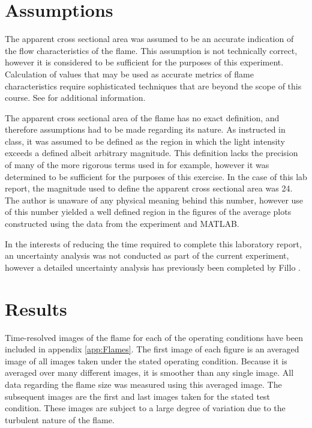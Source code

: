 \documentclass[12pt]{ussci} %
\begin{document}
\section{Assumptions}
The apparent cross sectional area was assumed to be an accurate indication of the flow characteristics of the flame.  This assumption is not technically correct, however it is considered to be sufficient for the purposes of this experiment.  Calculation of values that may be used as accurate metrics of flame characteristics require sophisticated techniques that are beyond the scope of this course.  See \cite{Fillo2017} for additional information.


The apparent cross sectional area of the flame has no exact definition, and therefore assumptions had to be made regarding its nature.  As instructed in class, it was assumed to be defined as the region in which the light intensity exceeds a defined albeit arbitrary magnitude.  This definition lacks the precision of many of the more rigorous terms used in \cite{Fillo2015} for example, however it was determined to be sufficient for the purposes of this exercise.  In the case of this lab report, the magnitude used to define the apparent cross sectional area was 24.  The author is unaware of any physical meaning behind this number, however use of this number yielded a well defined region in the figures of the average plots constructed using the data from the experiment and MATLAB.


In the interests of reducing the time required to complete this laboratory report, an uncertainty analysis was not conducted as part of the current experiment, however a detailed uncertainty analysis has previously been completed by Fillo \cite{Fillo2017}.

\section{Results}
Time-resolved images of the flame for each of the operating conditions have been included in appendix \ref{app:Flames}.  The first image of each figure is an averaged image of all images taken under the stated operating condition.  Because it is averaged over many different images, it is smoother than any single image.  All data regarding the flame size was measured using this averaged image.  The subsequent images are the first and last images taken for the stated test condition.  These images are subject to a large degree of variation due to the turbulent nature of the flame.
\end{document}

